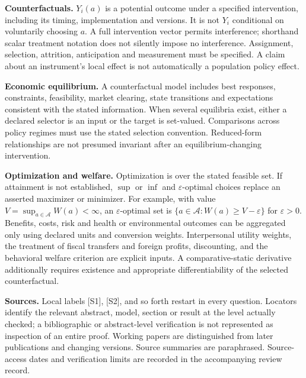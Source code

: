 \documentclass[11pt,a4paper]{article}
\begin{document}
\textbf{Counterfactuals.} $Y_i(a)$ is a potential outcome under a specified intervention, including its timing, implementation and versions. It is not $Y_i$ conditional on voluntarily choosing $a$. A full intervention vector permits interference; shorthand scalar treatment notation does not silently impose no interference. Assignment, selection, attrition, anticipation and measurement must be specified. A claim about an instrument's local effect is not automatically a population policy effect.

\textbf{Economic equilibrium.} A counterfactual model includes best responses, constraints, feasibility, market clearing, state transitions and expectations consistent with the stated information. When several equilibria exist, either a declared selector is an input or the target is set-valued. Comparisons across policy regimes must use the stated selection convention. Reduced-form relationships are not presumed invariant after an equilibrium-changing intervention.

\textbf{Optimization and welfare.} Optimization is over the stated feasible set. If attainment is not established, $\sup$ or $\inf$ and $\varepsilon$-optimal choices replace an asserted maximizer or minimizer. For example, with value $V=\sup_{a\in\mathcal A}W(a)<\infty$, an $\varepsilon$-optimal set is $\{a\in\mathcal A:W(a)\geq V-\varepsilon\}$ for $\varepsilon>0$. Benefits, costs, risk and health or environmental outcomes can be aggregated only using declared units and conversion weights. Interpersonal utility weights, the treatment of fiscal transfers and foreign profits, discounting, and the behavioral welfare criterion are explicit inputs. A comparative-static derivative additionally requires existence and appropriate differentiability of the selected counterfactual.

\textbf{Sources.} Local labels [S1], [S2], and so forth restart in every question. Locators identify the relevant abstract, model, section or result at the level actually checked; a bibliographic or abstract-level verification is not represented as inspection of an entire proof. Working papers are distinguished from later publications and changing versions. Source summaries are paraphrased. Source-access dates and verification limits are recorded in the accompanying review record.
\end{document}
